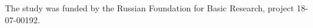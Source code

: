 









\Ack


\noindent


The study was funded by the Russian Foundation for Basic Research, project 18-07-00192.










\renewcommand{\bibname}{\protect\rmfamily References}







